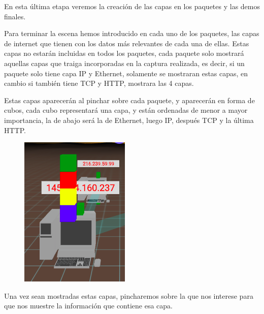 \documentclass[a4paper, 12pt]{book}
\begin{document}
En esta última etapa veremos la creación de las capas en los paquetes y las demos finales.

Para terminar la escena hemos introducido en cada uno de los paquetes, las capas de internet que tienen con los datos más relevantes de cada una de ellas. Estas capas no estarán incluidas en todos los paquetes, cada paquete solo mostrará aquellas capas que traiga incorporadas en la captura realizada, es decir, si un paquete solo tiene capa IP y Ethernet, solamente se mostraran estas capas, en cambio si también tiene TCP y HTTP, mostrara las 4 capas.

Estas capas aparecerán al pinchar sobre cada paquete, y aparecerán en forma de cubos, cada cubo representará una capa, y están ordenadas de menor a mayor importancia, la de abajo será la de Ethernet, luego IP, después TCP y la última HTTP.
\begin{figure}[h]
\centering
    \includegraphics[scale=0.5]{img/capas.png}
\end{figure}

Una vez sean mostradas estas capas, pincharemos sobre la que nos interese para que nos muestre la información que contiene esa capa.
\end{document}
